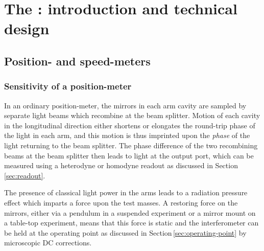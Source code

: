 \chapter{\label{c:speedmeter-intro}The \SSMEXPT{}: introduction and technical design}

\section{Position- and speed-meters}

\subsection{\label{sec:position-meter-measurement}Sensitivity of a position-meter}
In an ordinary \FPMI{} position-meter, the mirrors in each arm cavity are sampled by separate light beams which recombine at the beam splitter. Motion of each cavity in the longitudinal direction either shortens or elongates the round-trip phase of the light in each arm, and this motion is thus imprinted upon the \emph{phase} of the light returning to the beam splitter. The phase difference of the two recombining beams at the beam splitter then leads to light at the output port, which can be measured using a heterodyne or homodyne readout as discussed in Section\,\ref{sec:readout}.

The presence of classical light power in the arms leads to a radiation pressure effect which imparts a force upon the test masses. A restoring force on the mirrors, either via a pendulum in a suspended experiment or a mirror mount on a table-top experiment, means that this force is static and the interferometer can be held at the operating point as discussed in Section\,\ref{sec:operating-point} by microscopic \gls{DC} corrections.

